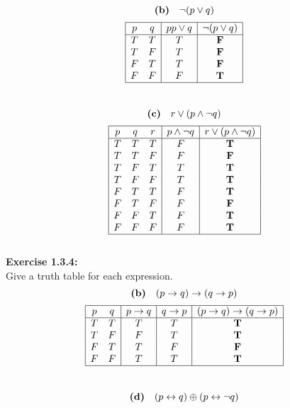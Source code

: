 \documentclass[12pt, letterpaper, twoside]{article}
\begin{document}
\[\text{\textbf{(b)}} \quad \neg{(}p \lor q)\]
\begin{displaymath}
\begin{array}{|c c|c|c|}
\hline
p & q  & p p \lor q & \neg{(}p \lor q)\\ 
\hline 
T & T & T & \textbf{F}\\
T & F & T & \textbf{F}\\
F & T & T & \textbf{F}\\
F & F & F & \textbf{T}\\
\hline
\end{array}
\end{displaymath}\\
\[\text{\textbf{(c)}} \quad r \lor (p \land \neg{q})\]
\begin{displaymath}
\begin{array}{|c c c|c|c|}
\hline
p & q & r & p \land \neg{q} & r \lor (p \land \neg{q})\\ 
\hline 
T & T & T & F & \textbf{T}\\
T & T & F & F & \textbf{F}\\
T & F & T & T & \textbf{T}\\
T & F & F & T & \textbf{T}\\
F & T & T & F & \textbf{T}\\
F & T & F & F & \textbf{F}\\
F & F & T & F & \textbf{T}\\
F & F & F & F & \textbf{T}\\
\hline
\end{array}
\end{displaymath}\\
\textbf{Exercise 1.3.4:}\\
Give a truth table for each expression.
\[\text{\textbf{(b)}} \quad (p \to q) \to (q \to p)\]
\begin{displaymath}
\begin{array}{|c c|c|c|c|}
\hline
p & q  & p \to q & q \to p & (p \to q) \to (q \to p)\\ 
\hline 
T & T & T & T & \textbf{T}\\
T & F & F & T & \textbf{T}\\
F & T & T & F & \textbf{F}\\
F & F & T & T & \textbf{T}\\
\hline
\end{array}
\end{displaymath}\\
\[\text{\textbf{(d)}} \quad (p \leftrightarrow q) \oplus (p \leftrightarrow \neg{q})\]
\end{document}
